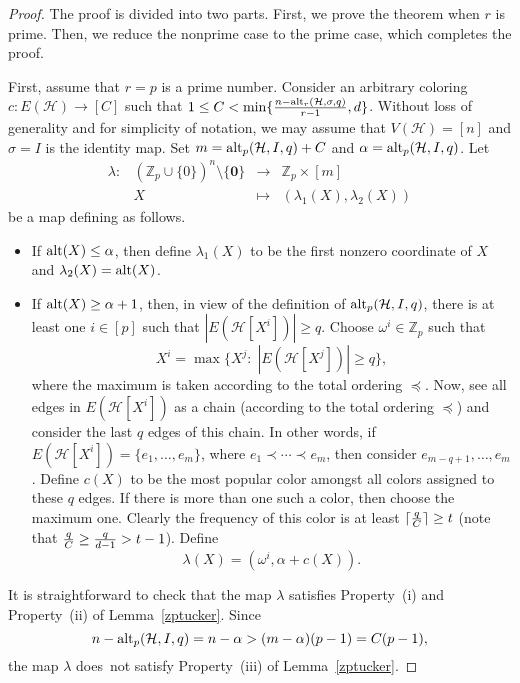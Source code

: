 \documentclass[11pt]{amsart}
\theoremstyle{definition}
\theoremstyle{remark}
\def\zero{\boldsymbol{0}}
\begin{document}
\begin{proof}
The proof is divided into two parts. 
First, we prove the theorem when $r$ is prime. 
Then, we reduce the nonprime case to the prime case, which completes the proof.

First, assume that $r=p$ is a prime number. Consider an arbitrary coloring $c:E(\mathcal{H})\longrightarrow [C]$ such that $1\leq C<\min\{{n-{\rm alt}_r(\mathcal{H},\sigma,q)\over r-1},d\}$. 
Without loss of generality and for simplicity of notation,  we may assume that $V(\mathcal{H})=[n]$ and  $\sigma=I$ is the identity map.
Set  $m={\rm alt}_p({\mathcal H},I,q)+C$
and $\alpha={\rm alt}_p({\mathcal H},I,q)$.
Let  $$\begin{array}{crcc}
\lambda: & (\mathbb{Z}_p\cup\{0\})^n\setminus\{\zero\} &\longrightarrow & \mathbb{Z}_p\times[m]\\
& X &\longmapsto & (\lambda_1(X),\lambda_2(X))
\end{array}$$ 
be a map defining as follows. 
\begin{itemize}
\item If ${\rm alt}(X)\leq \alpha$, then define $\lambda_1(X)$ to be the first 
nonzero coordinate of $X$ and $\lambda_2(X)={\rm alt}(X)$.
\item If ${\rm alt}(X)\geq \alpha+1$, then, in view of the definition of 
${\rm alt}_p({\mathcal H},I,q)$, there is at least one $i\in[p]$ such that $|E(\mathcal{H}[X^i])|\geq q$. 
Choose $\omega^i\in\mathbb{Z}_p$ such that 
$$X^i=\max\{X^j:\; |E(\mathcal{H}[X^j])|\geq q\},$$
where the maximum is taken according to the total ordering $\preceq$.
Now, see all edges in $E(\mathcal{H}[X^i])$ as a chain (according to the total ordering $\preceq$) and 
consider the last $q$ edges of this chain.
In other words, if $E(\mathcal{H}[X^i])=\{e_1,\ldots,e_{m}\}$, where $e_1\prec\cdots\prec e_m$, then
consider $e_{m-q+1},\ldots,e_{m}$.
Define $c(X)$ to be the 
most popular color amongst all colors assigned  to these $q$ edges.
If there is more than one such a color, then choose the maximum one.  
Clearly the frequency of this color is at least $\lceil{q\over C}\rceil\geq t$
(note that ${q\over C}\geq{q\over d-1 }> t-1$).
Define $$\lambda(X)=(\omega^i,\alpha+c(X)).$$
\end{itemize}
It is straightforward to check that the map  $\lambda$ satisfies  Property~(i) and Property~(ii) of Lemma~\ref{zptucker}. Since 
$$n-{\rm alt}_p({\mathcal H},I,q)=n-\alpha> (m-\alpha)(p-1)=C(p-1),$$
the map $\lambda$ does~not satisfy Property~(iii) of Lemma~\ref{zptucker}. 

\end{proof}
\end{document}
